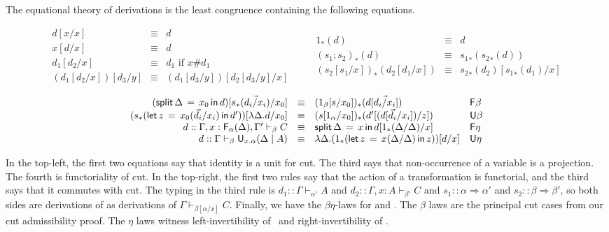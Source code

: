 \documentclass[a4paper,USenglish,numberwithinsect]{lipics-v2016}
\newcommand\D{\ensuremath{d}} %
\newcommand\deq{\ensuremath{\equiv}}
\newcommand\spr{\ensuremath{\Rightarrow}} %
\newcommand\seq[3]{\ensuremath{#1 \vdash_{#2} #3}}
\newcommand\F[2]{\ensuremath{\dsd{F}_{#1}(#2)}}
\newcommand\U[3]{\ensuremath{\dsd{U}_{#1}(#2 \mid #3)}}
\newcommand\Fsymb[0]{\dsd{F}}
\newcommand\Usymb[0]{\dsd{U}}
\renewcommand\subst[3]{\ensuremath{#1[#2/#3]}}
\newcommand\FLd[3]{\ensuremath{\dsd{split} \, #2 \, = \, {#1} \, \dsd{in} \, #3}}
\newcommand\FRd[3]{\ensuremath{\Trd{#2}{#3}}}
\newcommand\ULd[6]{\ensuremath{\Trd{#3}{\dsd{let} \, #5 \, = \, #1(#4) \, \dsd{in} \, #6 }}}
\newcommand\URd[2]{\ensuremath{\lambda #1.#2}}
\newcommand\Trd[2]{\ensuremath{#1_*(#2)}}
\newcommand\Ident[1]{\ensuremath{{#1}}}
\newcommand\Cut[3]{\ensuremath{#1[#2/#3]}}
\begin{document}
The equational theory of derivations is the least congruence containing
the following equations.  
\begin{small}
\[
\begin{array}{rcll} 
\Cut{\D}{\Ident{x}}{x} & \deq & \D \\
\Cut{\Ident{x}}{\D}{x} & \deq & \D \\
\Cut{\D_1}{\D_2}{x} & \deq & \D_1 \text{ if $x \# \D_1$}\\
\Cut{(\Cut{\D_1}{\D_2}{x})}{\D_3}{y} & \deq & \Cut{(\Cut{\D_1}{\D_3}{y})}{\Cut{\D_2}{\D_3}{y}}{x}\\
\end{array}
\qquad
\begin{array}{rcll}
\Trd{1}{\D} & \deq & \D\\
\Trd{(s_1;s_2)}{\D} & \deq & \Trd{{s_1}}{\Trd{{s_2}}{\D}} \\
\Trd{(\subst{s_2}{s_1}{x})}{\Cut{\D_2}{\D_1}{x}} & \deq & \Cut{\Trd{{s_2}}{\D_2}}{\Trd{{s_1}}{\D_1}}{x} \\
\end{array}
\]
\[
\begin{array}{rcll}
\Cut{(\FLd{x_0}{\Delta}{\D})}{\FRd{}{s}{\vec{\D_i/x_i}}}{x_0} & \deq & \Trd{(1_\beta[s/x_0])}{\D[\vec{\D_i/x_i}]} & \dsd{F\beta} \\
\Cut{(\ULd{x_0}{}{s}{\vec{\D_i}/x_i}{z}{\D'})}{\URd{\Delta}{\D}}{x_0} & \deq & \Trd{(s[1_{\alpha}/{x_0}])}{\Cut{\D'}{(\D[{\vec{d_i}/x_i}])}{z}} & \dsd{U\beta} \\
\D :: \seq{\Gamma,x:\F{\alpha}{\Delta},\Gamma'}{\beta}{C} & \deq &
\FLd{x}{\Delta}{\Cut{\D}{\FRd{}{1}{\Delta/\Delta}}{x}} & \dsd{F\eta}\\
\D :: \seq{\Gamma}{\beta}{\U{x.\alpha}{\Delta}{A}} & \deq & \URd{\Delta}{\Cut{(\ULd{x}{}{1}{\Delta/\Delta}{z}{z})}{\D}{x}} & \dsd{U\eta}\\
\end{array}
\]
\end{small}

In the top-left, the first two equations say that identity is a unit for
cut.  The third says that non-occurrence of a variable is a projection.
The fourth is functoriality of cut.  In the top-right, the first two
rules say that the action of a transformation is functorial, and the
third says that it commutes with cut.  The typing in the third rule is
$\D_1 :: \seq{\Gamma}{\alpha'}{A}$ and $\D_2 ::
\seq{\Gamma,x:A}{\beta'}{C}$ and $s_1 :: \alpha \spr \alpha'$ and $s_2
:: \beta \spr \beta'$, so both sides are derivations of as derivations
of \seq{\Gamma}{\subst{\beta}{\alpha}{x}}{C}.  Finally, we have the
$\beta\eta$-laws for  and .  The $\beta$ laws are the
principal cut cases from our cut admissibility proof.  The $\eta$ laws
witness left-invertibility of \Fsymb\, and right-invertibility of
\Usymb.
\end{document}
